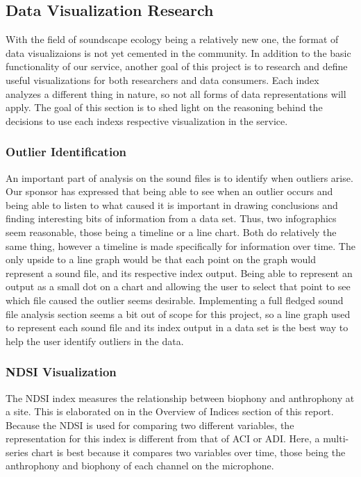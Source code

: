 \subsection{Data Visualization Research}
With the field of soundscape ecology being a relatively new one, the format of data visualizaions is not yet cemented in the community. In addition to the basic functionality of our service, another goal of this project is to research and define useful visualizations for both researchers and data consumers. Each index analyzes a different thing in nature, so not all forms of data representations will apply. The goal of this section is to shed light on the reasoning behind the decisions to use each index\textquotesingle s respective visualization in the service.

\subsubsection{Outlier Identification}
An important part of analysis on the sound files is to identify when outliers arise. Our sponsor has expressed that being able to see when an outlier occurs and being able to listen to what caused it is important in drawing conclusions and finding interesting bits of information from a data set. Thus, two infographics seem reasonable, those being a timeline or a line chart. Both do relatively the same thing, however a timeline is made specifically for information over time. The only upside to a line graph would be that each point on the graph would represent a sound file, and its respective index output. Being able to represent an output as a small dot on a chart and allowing the user to select that point to see which file caused the outlier seems desirable. Implementing a full fledged sound file analysis section seems a bit out of scope for this project, so a line graph used to represent each sound file and its index output in a data set is the best way to help the user identify outliers in the data.

\subsubsection{NDSI Visualization}
The NDSI index measures the relationship between biophony and anthrophony at a site. This is elaborated on in the Overview of Indices section of this report. Because the NDSI is used for comparing two different variables, the representation for this index is different from that of ACI or ADI. Here, a multi-series chart is best because it compares two variables over time, those being the anthrophony and biophony of each channel on the microphone.

